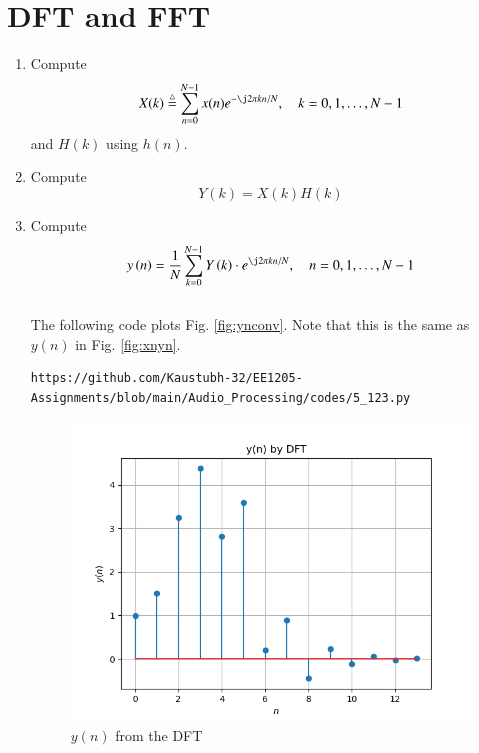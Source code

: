 \documentclass[journal,12pt,twocolumn]{IEEEtran}
\newcommand{\define}{\stackrel{\triangle}{=}}
\theoremstyle{remark}
\begin{document}
\section{DFT and FFT}
\begin{enumerate}[label=\thesection.\arabic*]
\item
Compute
\begin{equation}
X(k) \define \sum _{n=0}^{N-1}x(n) e^{-\j2\pi kn/N}, \quad k = 0,1,\dots, N-1
\end{equation}
and $H(k)$ using $h(n)$.
\item Compute 
\begin{equation}
Y(k) = X(k)H(k)\label{eq:eq_Y}
\end{equation}
\item Compute
\begin{equation}
 y\brak{n}={\frac {1}{N}}\sum _{k=0}^{N-1}Y\brak{k}\cdot e^{\j 2\pi kn/N},\quad n = 0,1,\dots, N-1
\end{equation}
\\
\solution The following code plots Fig. \ref{fig:ynconv}. Note that this is the same as 
$y(n)$ in  Fig. 
\ref{fig:xnyn}. 
%
\begin{lstlisting}
https://github.com/Kaustubh-32/EE1205-Assignments/blob/main/Audio_Processing/codes/5_123.py
\end{lstlisting}
\begin{figure}[!ht]
\centering
\includegraphics[width=\columnwidth]{5_123.png}
\caption{$y(n)$ from the DFT}
\label{fig:yndft}
\end{figure}


\end{enumerate}
\end{document}
